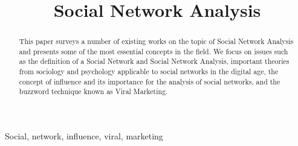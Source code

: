 \documentclass[conference,letterpaper]{IEEEtran}
\begin{document}
\title{\huge Social Network Analysis}

\author{
}

\maketitle
\begin{abstract}
This paper surveys a number of existing works on the topic of Social Network Analysis and presents some of the most essential concepts in the field.
We focus on issues such as the definition of a Social Network and Social Network Analysis, important theories from sociology and psychology applicable
to social networks in the digital age, the concept of influence and its importance for the analysis of social networks, and the buzzword technique
known as Viral Marketing.
\\
\end{abstract}

\begin{keywords}
Social, network, influence, viral, marketing
\end{keywords}
\end{document}
